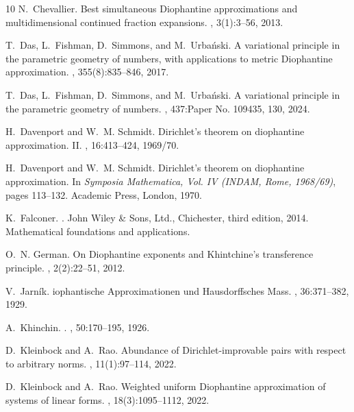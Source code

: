 \documentclass[10pt]{amsart}
\theoremstyle{definition}
\begin{document}
\begin{thebibliography}{10}
N.~Chevallier.
\newblock Best simultaneous {D}iophantine approximations and multidimensional
  continued fraction expansions.
, 3(1):3--56, 2013.

T.~Das, L.~Fishman, D.~Simmons, and M.~Urba\'nski.
\newblock A variational principle in the parametric geometry of numbers, with
  applications to metric {D}iophantine approximation.
, 355(8):835--846, 2017.

T.~Das, L.~Fishman, D.~Simmons, and M.~Urba\'{n}ski.
\newblock A variational principle in the parametric geometry of numbers.
, 437:Paper No. 109435, 130, 2024.

H.~Davenport and W.~M. Schmidt.
\newblock Dirichlet's theorem on diophantine approximation. {II}.
, 16:413--424, 1969/70.

H.~Davenport and W.~M. Schmidt.
\newblock Dirichlet's theorem on diophantine approximation.
\newblock In {\em Symposia {M}athematica, {V}ol. {IV} ({INDAM}, {R}ome,
  1968/69)}, pages 113--132. Academic Press, London, 1970.

K.~Falconer.
.
\newblock John Wiley \& Sons, Ltd., Chichester, third edition, 2014.
\newblock Mathematical foundations and applications.

O.~N. German.
\newblock On {D}iophantine exponents and {K}hintchine's transference principle.
, 2(2):22--51, 2012.

V.~Jarn\'ik.
iophantische {A}pproximationen und {H}ausdorffsches {M}ass.
, 36:371--382, 1929.

A.~Khinchin.
.
, 50:170--195, 1926.

D.~Kleinbock and A.~Rao.
\newblock Abundance of {D}irichlet-improvable pairs with respect to arbitrary
  norms.
, 11(1):97--114, 2022.

D.~Kleinbock and A.~Rao.
\newblock Weighted uniform {D}iophantine approximation of systems of linear
  forms.
, 18(3):1095--1112, 2022.


\end{thebibliography}
\end{document}
